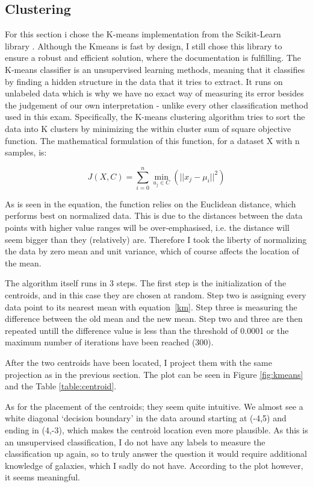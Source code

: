 \documentclass{article}
\theoremstyle{plain}
\theoremstyle{nonumberplain}
\begin{document}
\subsection{Clustering}

For this section i chose the K-means implementation from the Scikit-Learn library \cite{website:kmeans}. 
Although the Kmeans is fast by design, I still chose this library to ensure a robust and efficient solution, where the documentation is fulfilling. 
The K-means classifier is an unsupervised learning methods, meaning that it classifies by finding a hidden structure in the data that it tries to extract. 
It runs on unlabeled data which is why we have no exact way of measuring its error besides the judgement of our own interpretation - unlike every other classification method used in this exam. 
Specifically, the K-means clustering algorithm tries to sort the data into K clusters by minimizing the within cluster sum of square objective function. 
The mathematical formulation of this function, for a dataset X with n samples, is:

\begin{equation} \label{km}
J(X,C) = \sum_{i=0}^n \min_{u_j \in C}(||x_j - \mu_i||^2)
\end{equation}

As is seen in the equation, the function relies on the Euclidean distance, which performs best on normalized data.
This is due to the distances between the data points with higher value ranges will be over-emphasised, i.e. the distance will seem bigger than they (relatively) are.
Therefore I took the liberty of normalizing the data by zero mean and unit variance, which of course affects the location of the mean. 

The algorithm itself runs in 3 steps.
The first step is the initialization of the centroids, and in this case they are chosen at random. 
Step two is assigning every data point to its nearest mean with equation~\eqref{km}. 
Step three is measuring the difference between the old mean and the new mean.
Step two and three are then repeated untill the difference value is less than the threshold of 0.0001 or the maximum number of iterations have been reached (300). 

After the two centroids have been located, I project them with the same projection as in the previous section.
The plot can be seen in Figure \ref{fig:kmeans} and the Table \ref{table:centroid}. 

As for the placement of the centroids; they seem quite intuitive.
We almost see a white diagonal `decision boundary' in the data around starting at (-4,5) and ending in (4,-3), which makes the centroid location even more plausible.
As this is an unsupervised classification, I do not have any labels to measure the classification up again, so to truly answer the question it would require additional knowledge of galaxies, which I sadly do not have. 
According to the plot however, it seems meaningful. 
\end{document}
